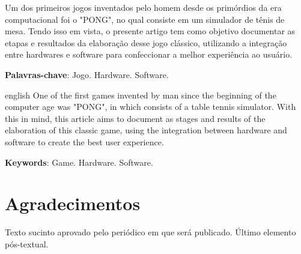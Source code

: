 \documentclass[
	article,			%
	11pt,				%
	oneside,			%
	a4paper,			%
	english,			%
	brazil,				%
	sumario=tradicional
	]{abntex2}
\begin{document}
\frenchspacing
%
\maketitle

\begin{resumoumacoluna}
   Um dos primeiros jogos inventados pelo homem desde os primórdios da era computacional foi o "PONG", no qual 
   consiste em um simulador de tênis de mesa. Tendo isso em vista, o presente artigo tem como objetivo documentar  
   as etapas e resultados da elaboração desse jogo clássico, utilizando a integração entre hardwares e software 
   para confeccionar a melhor experiência ao usuário. 

   \vspace{\onelineskip}

   \noindent
   \textbf{Palavras-chave}: Jogo. Hardware. Software.
\end{resumoumacoluna}

\renewcommand{\resumoname}{Abstract}
\begin{resumoumacoluna}
   \begin{otherlanguage*}{english}
   One of the first games invented by man since the beginning of the computer age was "PONG", in which
   consists of a table tennis simulator. With this in mind, this article aims to document as stages and
   results of the elaboration of this classic game, using the integration between hardware and software to 
   create the best user experience.

      \vspace{\onelineskip}

      \noindent
      \textbf{Keywords}: Game. Hardware. Software.
   \end{otherlanguage*}
\end{resumoumacoluna}

\textual
%





\postextual
% 

% 
\section*{Agradecimentos}
Texto sucinto aprovado pelo periódico em que será publicado. Último elemento pós-textual.
%
\end{document}
